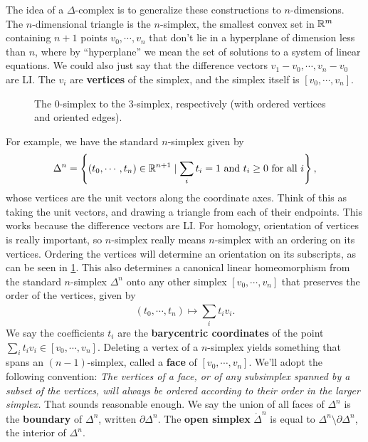 The idea of a $\Delta $-complex is to generalize these constructions to $n$-dimensions. The $n$-dimensional triangle is the $n$-simplex, the smallest convex set in $\mathbb{R}^m$ containing $n+1$ points $v_0,\cdots,v_n$ that don't lie in a hyperplane of dimension less than $n$, where by ``hyperplane'' we mean the set of solutions to a system of linear equations. We could also just say that the difference vectors $v_1-v_0,\cdots,v_n-v_0$ are LI. The $v_i$ are \textbf{vertices} of the simplex, and the simplex itself is $[v_0,\cdots,v_n]$.
\begin{figure}[H]
    \centering
    \caption{The $0$-simplex to the $3$-simplex, respectively (with ordered vertices and oriented edges).}
    \label{simp}
\end{figure}
For example, we have the standard $n$-simplex given by \[
    \Delta ^n =\left\{(t_0,\cdots,t_n )\in \R^{n+1} \mid \sum_{i}^{} t_i=1 \ \text{and} \ t_i \geq 0 \ \text{for all} \ i\right\},
\] whose vertices are the unit vectors along the coordinate axes. Think of this as taking the unit vectors, and drawing a triangle from each of their endpoints. This works because the difference vectors are LI. For homology, orientation of vertices is really important, so $n$-simplex really means $n$-simplex with an ordering on its vertices. Ordering the vertices will determine an orientation on its subscripts, as can be seen in \cref{simp}. This also determines a canonical linear homeomorphism from the standard $n$-simplex $\Delta ^n $ onto any other simplex $[v_0,\cdots,v_n]$ that preserves the order of the vertices, given by 
\[
(t_0,\cdots,t_n )\mapsto \sum_{i}^{} t_iv_i.
\] We say the coefficients $t_i$ are the \textbf{barycentric coordinates} of the point $\sum_{i}^{} t_i v_i \in [v_0,\cdots,v_n ].$ Deleting a vertex of a $n$-simplex yields something that spans an $(n-1)$-simplex, called a \textbf{face} of $[v_0,\cdots,v_n ]$. We'll adopt the following convention:
\textit{The vertices of a face, or of any subsimplex spanned by a subset of the vertices,  will always be ordered according to their order in the larger simplex.}
That sounds reasonable enough. We say the union of all faces of $\Delta ^n $ is the \textbf{boundary} of $\Delta ^n $, written $\partial \Delta ^n $. The \textbf{open simplex} $\mathring{\Delta }^n $ is equal to $\Delta ^n \setminus \partial \Delta ^n $, the interior of $\Delta ^n $. 

